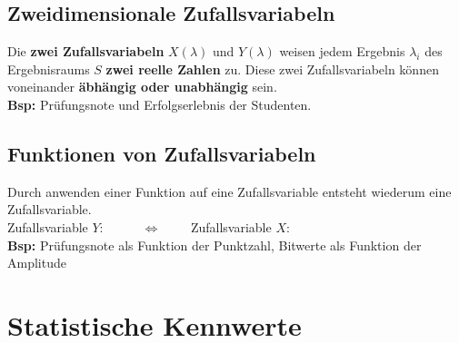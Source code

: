 		\subsection{Zweidimensionale Zufallsvariabeln}
			Die \textbf{zwei Zufallsvariabeln} $X(\lambda)$ und $Y(\lambda)$ weisen jedem Ergebnis $\lambda_i$ des Ergebnisraums $S$ \textbf{zwei reelle Zahlen} zu. Diese zwei Zufallsvariabeln können voneinander \textbf{äbhängig oder unabhängig} sein.\\[0.2cm]
			\textbf{Bsp:} Prüfungsnote und Erfolgserlebnis der Studenten.

		\subsection{Funktionen von Zufallsvariabeln}
			Durch anwenden einer Funktion auf eine Zufallsvariable entsteht wiederum eine Zufallsvariable.\\[0.2cm]
			Zufallsvariable $Y$:$\quad$$\qquad\Leftrightarrow\qquad$ Zufallsvariable $X$:$\quad$\\[0.2cm]
			\textbf{Bsp:} Prüfungsnote als Funktion der Punktzahl, Bitwerte als Funktion der Amplitude
\newpage

	\section{Statistische Kennwerte}

